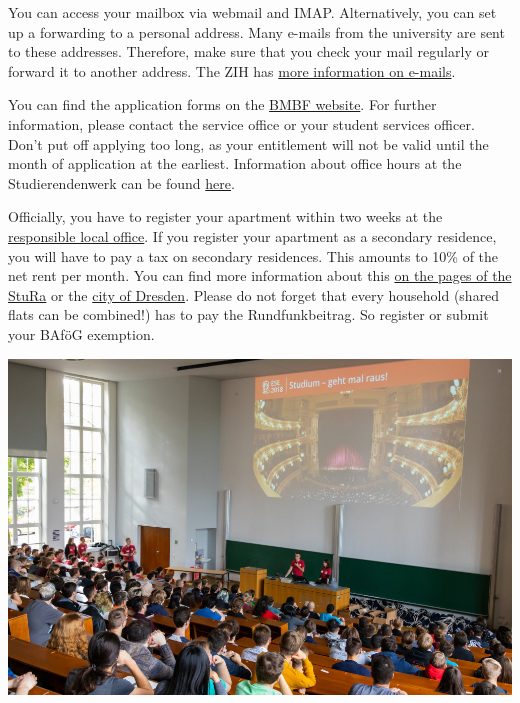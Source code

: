 \begin{itemize}
You can access your mailbox via webmail and IMAP\@. 
Alternatively, you can set up a forwarding to a personal address. 
Many e-mails from the university are sent to these addresses. 
Therefore, make sure that you check your mail regularly or forward it to another address.
The ZIH has 
\href{https://tu-dresden.de/zih/dienste/service-katalog/arbeitsumgebung/e_mail/}{more information on e-mails}.

You can find the application forms on the \href{https://www.bafög.de/de/alle-antragsformulare-432.php}{BMBF website}.
For further information, please contact the service office or your student services officer.
Don't put off applying too long, as your entitlement will not be valid until the month of application at the earliest.
Information about office hours at the Studierendenwerk can be found \href{https://www.studentenwerk-dresden.de/finanzierung/servicebuero.html}{here}.

\label{sec:ummelden}
Officially, you have to register your apartment within two weeks at the 
\href{https://www.dresden.de/de/rathaus/dienstleistungen/wohnsitz_meldung_d115.php}{responsible local office}.
If you register your apartment as a secondary residence, you will have to pay a tax on secondary residences.
This amounts to 10\% of the net rent per month.
You can find more information about this 
\href{https://www.stura.tu-dresden.de/zweitwohnungssteuer}{on the pages of the StuRa} or the 
\href{https://www.dresden.de/de/rathaus/dienstleistungen/zweitwohnungssteuer.php}{city of Dresden}.
Please do not forget that every household (shared flats can be combined!) has to pay the Rundfunkbeitrag.
So register or submit your BAföG exemption.

\includegraphics[width=.93\linewidth]{img/begruessung1.jpg}


\end{itemize}

